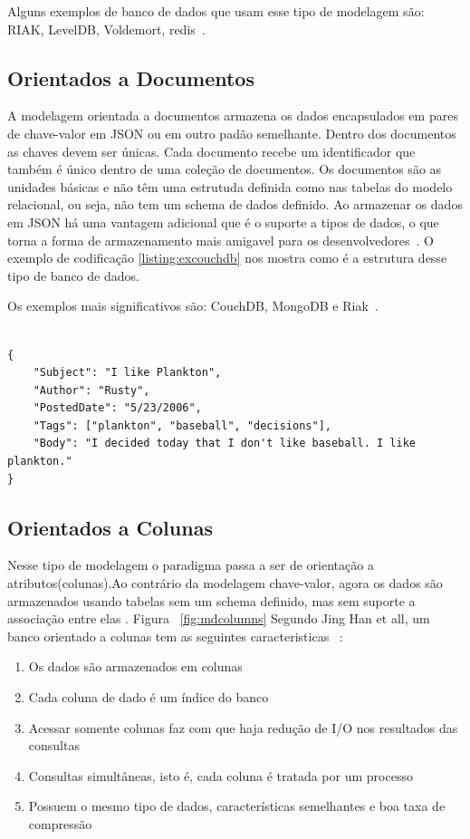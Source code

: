 Alguns exemplos de banco de dados que usam esse tipo de modelagem são: RIAK, LevelDB, Voldemort, redis~\cite{nosqldatabaseorg}.

\subsection{Orientados a Documentos}

A modelagem orientada a documentos armazena os dados encapsulados em pares de chave-valor em JSON ou em outro padão semelhante. Dentro dos documentos as chaves devem ser únicas. Cada documento recebe um identificador que também é único dentro de uma coleção de documentos. Os documentos são as unidades básicas e não têm uma estrutuda definida como nas tabelas do modelo relacional, ou seja, não tem um schema de dados definido. Ao armazenar os dados em JSON há uma vantagem adicional que é o suporte a tipos de dados, o que torna a forma de armazenamento mais amigavel para os desenvolvedores~\cite{nosqlevaluation,nosqlxrelacional}. O exemplo de codificação \ref{listing:excouchdb} nos mostra como é a estrutura desse tipo de banco de dados.

Os exemplos mais significativos são: CouchDB, MongoDB e Riak~\cite{nosqlevaluation}.

	\begin{lstlisting}[caption=Exemplo de arquivo do CouchDB, frame=trBL,breaklines=true,label=listing:excouchdb]

{
    "Subject": "I like Plankton",
    "Author": "Rusty",
    "PostedDate": "5/23/2006",
    "Tags": ["plankton", "baseball", "decisions"],
    "Body": "I decided today that I don't like baseball. I like plankton."
}
	\end{lstlisting}

\subsection{Orientados a Colunas}

Nesse tipo de modelagem o paradigma passa a ser de orientação a atributos(colunas).Ao contrário da modelagem chave-valor, agora os dados são armazenados usando tabelas sem um schema definido, mas sem suporte a associação entre elas . Figura ~\ref{fig:mdcolumns} Segundo Jing Han et all, um banco orientado a colunas tem as seguintes caracteristicas ~\cite{surveynosql}:


\begin{enumerate}
\item{Os dados são armazenados em colunas}
\item{Cada coluna de dado é um índice do banco}
\item{Acessar somente colunas faz com que haja redução de I/O nos resultados das consultas}
\item{Consultas simultâneas, isto é, cada coluna é tratada por um processo}
\item{Possuem o mesmo tipo de dados, características semelhantes e boa taxa de compressão}
\end{enumerate}


